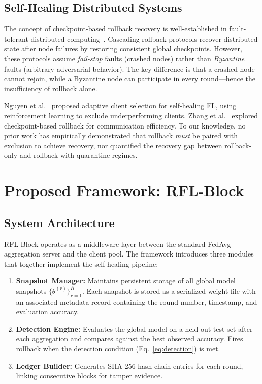 \documentclass[conference]{IEEEtran}
\begin{document}
\subsection{Self-Healing Distributed Systems}
The concept of checkpoint-based rollback recovery is well-established in fault-tolerant distributed computing~\cite{elnozahy2002roster}. Cascading rollback protocols recover distributed state after node failures by restoring consistent global checkpoints. However, these protocols assume \emph{fail-stop} faults (crashed nodes) rather than \emph{Byzantine} faults (arbitrary adversarial behavior). The key difference is that a crashed node cannot rejoin, while a Byzantine node can participate in every round---hence the insufficiency of rollback alone.

Nguyen et al.~\cite{nguyen2022selfhealing} proposed adaptive client selection for self-healing FL, using reinforcement learning to exclude underperforming clients. Zhang et al.~\cite{zhang2023rollbackfl} explored checkpoint-based rollback for communication efficiency. To our knowledge, no prior work has empirically demonstrated that rollback \emph{must} be paired with exclusion to achieve recovery, nor quantified the recovery gap between rollback-only and rollback-with-quarantine regimes.

\section{Proposed Framework: RFL-Block}
\label{sec:proposed}

\subsection{System Architecture}
RFL-Block operates as a middleware layer between the standard FedAvg aggregation server and the client pool. The framework introduces three modules that together implement the self-healing pipeline:

\begin{enumerate}
    \item \textbf{Snapshot Manager:} Maintains persistent storage of all global model snapshots $\{\theta^{(r)}\}_{r=1}^{R}$. Each snapshot is stored as a serialized weight file with an associated metadata record containing the round number, timestamp, and evaluation accuracy.
    \item \textbf{Detection Engine:} Evaluates the global model on a held-out test set after each aggregation and compares against the best observed accuracy. Fires rollback when the detection condition (Eq.~\ref{eq:detection}) is met.
    \item \textbf{Ledger Builder:} Generates SHA-256 hash chain entries for each round, linking consecutive blocks for tamper evidence.
\end{enumerate}
\end{document}
